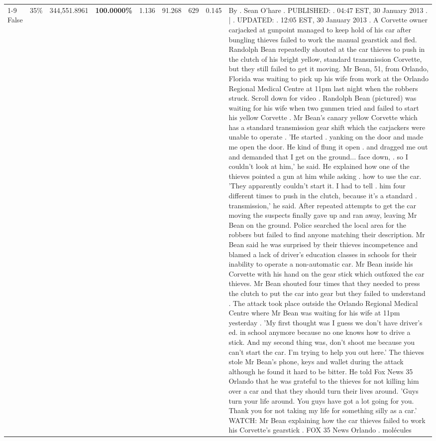 \begin{table}[H]
\begin{tabular}{lllrlllll}
\cline{1-9} \cline{2-9}
False & 35\% & 344,551.8961 & \bfseries \color{red} 100.0000\% & 1.136 & 91.268 & 629 & 0.145 & By . Sean O'hare . PUBLISHED: . 04:47 EST, 30 January 2013 . | . UPDATED: . 12:05 EST, 30 January 2013 . A Corvette owner carjacked at gunpoint managed to keep hold of his car after bungling thieves failed to work the manual gearstick and fled. Randolph Bean repeatedly shouted at the car thieves to push in the clutch of his bright yellow, standard transmission Corvette, but they still failed to get it moving. Mr Bean, 51, from Orlando, Florida was waiting to pick up his wife from work at the Orlando Regional Medical Centre at 11pm last night when the robbers struck. Scroll down for video . Randolph Bean (pictured) was waiting for his wife when two gunmen tried and failed to start his yellow Corvette . Mr Bean's canary yellow Corvette which has a standard transmission gear shift which the carjackers were unable to operate . 'He started . yanking on the door and made me open the door. He kind of flung it open . and dragged me out and demanded that I get on the ground... face down, . so I couldn't look at him,' he said. He explained how one of the thieves pointed a gun at him while asking . how to use the car. 'They apparently couldn't start it. I had to tell . him four different times to push in the clutch, because it's a standard . transmission,' he said. After repeated attempts to get the car moving the suspects finally gave up and ran away, leaving Mr Bean on the ground. Police searched the local area for the robbers but failed to find anyone matching their description. Mr Bean said he was surprised by their thieves incompetence and blamed a lack of driver's education classes in schools for their inability to operate a non-automatic car. Mr Bean inside his Corvette with his hand on the gear stick which outfoxed the car thieves. Mr Bean shouted four times that they needed to press the clutch to put the car into gear but they failed to understand . The attack took place outside the Orlando Regional Medical Centre where Mr Bean was waiting for his wife at 11pm yesterday . 'My first thought was I guess we don't have driver's ed. in school anymore because no one knows how to drive a stick. And my second thing was, don't shoot me because you can't start the car. I'm trying to help you out here.' The thieves stole Mr Bean's phone, keys and wallet during the attack although he found it hard to be bitter. He told Fox News 35 Orlando that he was grateful to the thieves for not killing him over a car and that they should turn their lives around. 'Guys turn your life around. You guys have got a lot going for you. Thank you for not taking my life for something silly as a car.' WATCH: Mr Bean explaining how the car thieves failed to work his Corvette's gearstick . FOX 35 News Orlando . molécules \\

\end{tabular}
\end{table}
